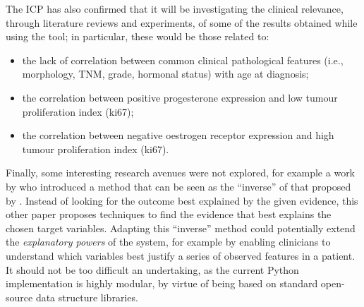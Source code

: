 The ICP has also confirmed that it will be investigating the clinical relevance, through literature reviews and experiments, of some of the results obtained while using the tool; in particular, these would be those related to:
\begin{itemize}
  \item the lack of correlation between common clinical pathological features (i.e., morphology, TNM, grade, hormonal status) with age at diagnosis;
  \item the correlation between positive progesterone expression and low tumour proliferation index (ki67);
  \item the correlation between negative oestrogen receptor expression and high tumour proliferation index (ki67).
\end{itemize}

Finally, some interesting research avenues were not explored, for example a work by \citet{Kyrimi2016} who introduced a method that can be seen as the \enquote{inverse} of that proposed by \citet{Butz2018}.
Instead of looking for the outcome best explained by the given evidence, this other paper proposes techniques to find the evidence that best explains the chosen target variables.
Adapting this \enquote{inverse} method could potentially extend the \textit{explanatory powers} of the system, for example by enabling clinicians to understand which variables best justify a series of observed features in a patient.
It should not be too difficult an undertaking, as the current Python implementation is highly modular, by virtue of being based on standard open-source data structure libraries.